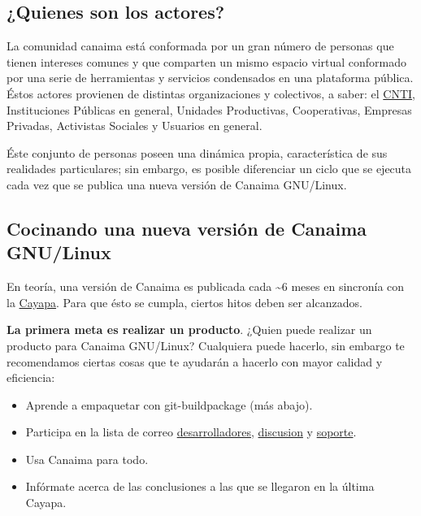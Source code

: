 \documentclass[letterpaper,12pt,spanish]{manual}
\begin{document}
\subsection{¿Quienes son los actores?}

La comunidad canaima está conformada por un gran número de personas que tienen intereses comunes y que comparten un mismo espacio virtual conformado por una serie de herramientas y servicios condensados en una plataforma pública. Éstos actores provienen de distintas organizaciones y colectivos, a saber: el \href{http://www.cnti.gob.ve/}{CNTI}, Instituciones Públicas en general, Unidades Productivas, Cooperativas, Empresas Privadas, Activistas Sociales y Usuarios en general.

Éste conjunto de personas poseen una dinámica propia, característica de sus realidades particulares; sin embargo, es posible diferenciar un ciclo que se ejecuta cada vez que se publica una nueva versión de Canaima GNU/Linux.


\subsection{Cocinando una nueva versión de Canaima GNU/Linux}

En teoría, una versión de Canaima es publicada cada \textasciitilde{}6 meses en sincronía con la \href{http://cayapa.canaima.softwarelibre.gob.ve/}{Cayapa}. Para que ésto se cumpla, ciertos hitos deben ser alcanzados.

\textbf{La primera meta es realizar un producto}. ¿Quien puede realizar un producto para Canaima GNU/Linux? Cualquiera puede hacerlo, sin embargo te recomendamos ciertas cosas que te ayudarán a hacerlo con mayor calidad y eficiencia:
\begin{itemize}
\item {} 
Aprende a empaquetar con git-buildpackage (más abajo).

\item {} 
Participa en la lista de correo \href{http://listas.canaima.softwarelibre.gob.ve/cgi-bin/mailman/listinfo/desarrolladores}{desarrolladores}, \href{http://listas.canaima.softwarelibre.gob.ve/cgi-bin/mailman/listinfo/discusion}{discusion} y \href{http://listas.canaima.softwarelibre.gob.ve/cgi-bin/mailman/listinfo/soporte}{soporte}.

\item {} 
Usa Canaima para todo.

\item {} 
Infórmate acerca de las conclusiones a las que se llegaron en la última Cayapa.

\end{itemize}
\end{document}
